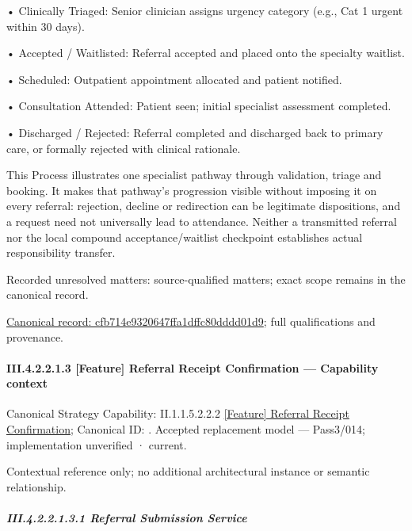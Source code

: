 •
Clinically Triaged: Senior clinician assigns urgency category (e.g., Cat 1 urgent within 30 days).



•
Accepted / Waitlisted: Referral accepted and placed onto the specialty waitlist.



•
Scheduled: Outpatient appointment allocated and patient notified.



•
Consultation Attended: Patient seen; initial specialist assessment completed.



•
Discharged / Rejected: Referral completed and discharged back to primary care, or formally rejected with clinical rationale.



This Process illustrates one specialist pathway through validation, triage and booking. It makes that pathway's progression visible without imposing it on every referral: rejection, decline or redirection can be legitimate dispositions, and a request need not universally lead to attendance. Neither a transmitted referral nor the local compound acceptance/waitlist checkpoint establishes actual responsibility transfer.


{\small Recorded unresolved matters: source-qualified matters; exact scope remains in the canonical record.}\par
{\footnotesize \href{../../../../../../../../continuum/business/business-process/cfb714e9320647ffa1dffc80dddd01d9.md}{Canonical record: cfb714e9320647ffa1dffc80dddd01d9}; full qualifications and provenance.}\par
\paragraph*{III.4.2.2.1.3 [Feature] Referral Receipt Confirmation — Capability context}
\label{navigation:III.4.2.2.1.3}

{\small Canonical Strategy Capability: II.1.1.5.2.2.2 \hyperref[element:518a838eb2c0463f8154334660b0405f]{[Feature] Referral Receipt Confirmation}; Canonical ID: \texttt{}. Accepted replacement model — Pass3/014; implementation unverified · current.}\par
Contextual reference only; no additional architectural instance or semantic relationship.\par
\subparagraph*{III.4.2.2.1.3.1 Referral Submission Service}
\label{navigation:III.4.2.2.1.3.1}

